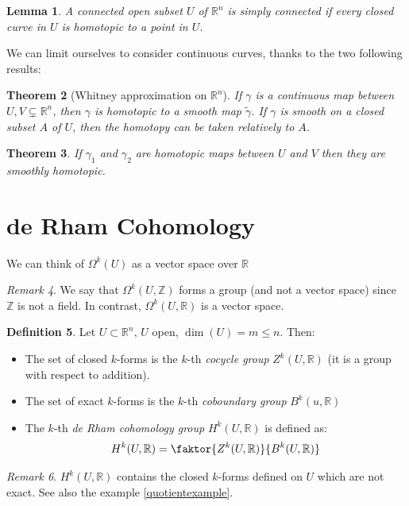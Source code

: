 \documentclass[a4paper,11pt,titlepage]{article}
\numberwithin{equation}{section}
\newtheorem{theorem}{Theorem}[section]
\newtheorem{lemma}[theorem]{Lemma}
\theoremstyle{definition}
\newtheorem{definition}[theorem]{Definition}
\theoremstyle{remark}
\newtheorem{remark}[theorem]{Remark}
\newcommand{\rfield}{\mathbb{R}}
\begin{document}
\begin{lemma}
  A connected open subset $U$ of $\rfield^n$ is simply connected if every closed curve in $U$ is homotopic to a point in $U$.
\end{lemma}

We can limit ourselves to consider continuous curves, thanks to the two following results:
\begin{theorem}[Whitney approximation on $\rfield^n$]
  If $\gamma$ is a continuous map between $U, V \subsetneq \rfield^n$, then $\gamma$ is homotopic to a smooth map $\tilde \gamma$. If $\gamma$ is smooth on a closed subset $A$ of $U$, then the homotopy can be taken relatively to $A$.
\end{theorem}

\begin{theorem}
  If $\gamma_1$ and $\gamma_2$ are homotopic maps between $U$ and $V$ then they are smoothly homotopic. %
\end{theorem}
\newpage
\section{de Rham Cohomology}
We can think of $\Omega^k(U)$ as a vector space over $\rfield$

\begin{remark}
  We say that $\Omega^k(U, \mathbb{Z})$ forms a group (and not a vector space) since $\mathbb{Z}$ is not a field. In contrast, $\Omega^k(U, \rfield)$ is a vector space.
\end{remark}

\begin{definition}
  Let $U \subset \rfield^n$, $U$ open, $\dim(U) = m \le n$. Then:
  \begin{itemize}
    \item The set of closed $k$-forms is the $k$-th \textit{cocycle group} $Z^k(U, \rfield)$ (it is a group with respect to addition).
    \item The set of exact $k$-forms is the $k$-th \textit{coboundary group} $B^k(u, \rfield)$
    \item The $k$-th \textit{de Rham cohomology group} $H^k(U, \rfield)$ is defined as: $$H^k(U, \rfield) = \faktor{Z^k(U, \rfield)}{B^k(U, \rfield)}$$
  \end{itemize}
\end{definition}

\begin{remark}
  $H^k(U, \rfield)$ contains the closed $k$-forms defined on $U$ which are not exact. See also the example \ref{quotientexample}.
\end{remark}
\end{document}
